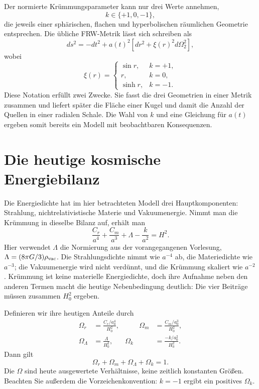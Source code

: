 Der normierte Krümmungsparameter kann nur drei Werte annehmen,
\begin{equation}
k\in\{+1,0,-1\},
\end{equation}
die jeweils einer sphärischen, flachen und hyperbolischen räumlichen Geometrie entsprechen. Die übliche FRW-Metrik lässt sich schreiben als
\begin{equation}
ds^2=-dt^2+a(t)^2\left[dr^2+\xi(r)^2d\Omega_2^2\right],
\label{eq:c06-frw}
\end{equation}
wobei
\begin{equation}
\xi(r)=
\begin{cases}
\sin r, & k=+1,\\
r, & k=0,\\
\sinh r, & k=-1.
\end{cases}
\label{eq:c06-xi}
\end{equation}
Diese Notation erfüllt zwei Zwecke. Sie fasst die drei Geometrien in einer Metrik zusammen und liefert später die Fläche einer Kugel und damit die Anzahl der Quellen in einer radialen Schale. Die Wahl von \(k\) und eine Gleichung für \(a(t)\) ergeben somit bereits ein Modell mit beobachtbaren Konsequenzen.

\section{Die heutige kosmische Energiebilanz}

Die Energiedichte hat im hier betrachteten Modell drei Hauptkomponenten: Strahlung, nichtrelativistische Materie und Vakuumenergie. Nimmt man die Krümmung in dieselbe Bilanz auf, erhält man
\begin{equation}
\frac{C_r}{a^4}
+\frac{C_m}{a^3}
+\Lambda
-\frac{k}{a^2}
=H^2.
\label{eq:c06-budget}
\end{equation}
Hier verwendet \(\Lambda\) die Normierung aus der vorangegangenen Vorlesung, \(\Lambda=(8\pi G/3)\rho_{\rm vac}\). Die Strahlungsdichte nimmt wie \(a^{-4}\) ab, die Materiedichte wie \(a^{-3}\); die Vakuumenergie wird nicht verdünnt, und die Krümmung skaliert wie \(a^{-2}\). Krümmung ist keine materielle Energiedichte, doch ihre Aufnahme neben den anderen Termen macht die heutige Nebenbedingung deutlich: Die vier Beiträge müssen zusammen \(H_0^2\) ergeben.

Definieren wir ihre heutigen Anteile durch
\begin{equation}
\begin{aligned}
\Omega_r&=\frac{C_r/a_0^4}{H_0^2},
&\qquad
\Omega_m&=\frac{C_m/a_0^3}{H_0^2},\\
\Omega_\Lambda&=\frac{\Lambda}{H_0^2},
&
\Omega_k&=\frac{-k/a_0^2}{H_0^2}.
\end{aligned}
\label{eq:c06-omegas}
\end{equation}
Dann gilt
\begin{equation}
\boxed{\Omega_r+\Omega_m+\Omega_\Lambda+\Omega_k=1.}
\label{eq:c06-sum-rule}
\end{equation}
Die \(\Omega\) sind heute ausgewertete Verhältnisse, keine zeitlich konstanten Größen. Beachten Sie außerdem die Vorzeichenkonvention: \(k=-1\) ergibt ein positives \(\Omega_k\).

